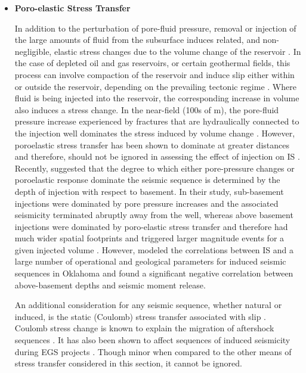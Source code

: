 \begin{itemize}
  \item{\textbf{Poro-elastic Stress Transfer}}
  
  In addition to the perturbation of pore-fluid pressure, removal or injection of the large amounts of fluid from the subsurface induces related, and non-negligible, elastic stress changes due to the volume change of the reservoir \citep{2013}. In the case of depleted oil and gas reservoirs, or certain geothermal fields, this process can involve compaction of the reservoir and induce slip either within or outside the reservoir, depending on the prevailing tectonic regime \citep{Segall_1994,Segall_1998}. Where fluid is being injected into the reservoir, the corresponding increase in volume also induces a stress change. In the near-field (100s of m), the pore-fluid pressure increase experienced by fractures that are hydraulically connected to the injection well dominates the stress induced by volume change \citep{2013}. However, poroelastic stress transfer has been shown to dominate at greater distances and therefore, should not be ignored in assessing the effect of injection on IS \citep{Goebel_2017}. Recently, \citet{Goebel_2018} suggested that the degree to which either pore-pressure changes or poroelastic response dominate the seismic sequence is determined by the depth of injection with respect to basement. In their study, sub-basement injections were dominated by pore pressure increases and the associated seismicity terminated abruptly away from the well, whereas above basement injections were dominated by poro-elastic stress transfer and therefore had much wider spatial footprints and triggered larger magnitude events for a given injected volume \citep{Goebel_2018}. However, \citet{Hincks_2018} modeled the correlations between IS and a large number of operational and geological parameters for induced seismic sequences in Oklahoma and found a significant negative correlation between above-basement depths and seismic moment release. 
  
  An additional consideration for any seismic sequence, whether natural or induced, is the static (Coulomb) stress transfer associated with slip \citep{okada1992internal}. Coulomb stress change is known to explain the migration of aftershock sequences \citep[e.g.][]{Toda_2003}. It has also been shown to affect sequences of induced seismicity during EGS projects \citep{Catalli_2016,Schoenball_2012}. Though minor when compared to the other means of stress transfer considered in this section, it cannot be ignored.


\end{itemize}

